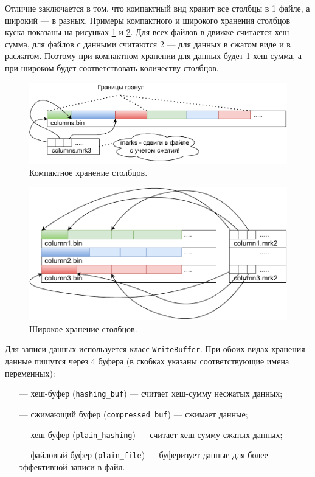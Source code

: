 Отличие заключается в том, что компактный вид хранит все столбцы в 1 файле, а широкий --- в разных. Примеры компактного и широкого хранения столбцов куска показаны на рисунках \ref{fig:compactstore} и \ref{fig:widestore}. Для всех файлов в движке считается хеш-сумма, для файлов с данными считаются 2 --- для данных в сжатом виде и в расжатом. Поэтому при компактном хранении для данных будет 1 хеш-сумма, а при широком будет соответствовать количеству столбцов.

\begin{figure}[hbtp]
	\centering
	\includegraphics[width=\textwidth]{img/compactstore.pdf}
	\caption{Компактное хранение столбцов.}
	\label{fig:compactstore}
\end{figure}

\begin{figure}[hbtp]
	\centering
	\includegraphics[width=\textwidth]{img/widestore.pdf}
	\caption{Широкое хранение столбцов.}
	\label{fig:widestore}
\end{figure}

Для записи данных используется класс \texttt{WriteBuffer}. При обоих видах хранения данные пишутся через 4 буфера (в скобках указаны соответствующие имена переменных):
\begin{itemize}
    \item [---] хеш-буфер (\texttt{hashing\_buf}) \cite{hashingbuf} --- считает хеш-сумму несжатых данных;
    \item [---] сжимающий буфер (\texttt{compressed\_buf}) \cite{compressingbuf} --- сжимает данные;
    \item [---] хеш-буфер (\texttt{plain\_hashing}) \cite{hashingbuf} --- считает хеш-сумму сжатых данных;
    \item [---] файловый буфер (\texttt{plain\_file}) \cite{filebuf} --- буферизует данные для более эффективной записи в файл.
\end{itemize}

